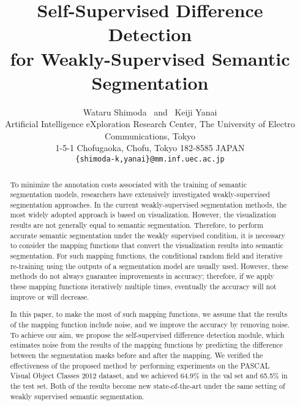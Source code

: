 \documentclass[10pt,twocolumn,letterpaper]{article}
\begin{document}
\title{Self-Supervised Difference Detection\\
for Weakly-Supervised Semantic Segmentation}

\author{Wataru Shimoda ~and~ Keiji Yanai \medskip \\
Artificial Intelligence eXploration Research Center,
The University of Electro Communications, Tokyo\\
1-5-1 Chofugaoka, Chofu, Tokyo 182-8585 JAPAN\\
{\tt\small \{shimoda-k,yanai\}@mm.inf.uec.ac.jp}
}

\maketitle




\begin{abstract}
To minimize the annotation costs associated with the training of semantic segmentation models,
researchers have extensively investigated weakly-supervised segmentation approaches.
In the current weakly-supervised segmentation methods, the most widely adopted approach is based on visualization.
However, the visualization results are not generally equal to semantic segmentation.
Therefore, to perform accurate semantic segmentation under the weakly supervised condition, it is necessary to consider the mapping functions that convert the visualization results into semantic segmentation.
For such mapping functions, the conditional random field and iterative re-training using the outputs of a segmentation model are usually used.
However, these methods do not always guarantee improvements in accuracy; therefore, if we apply these mapping functions iteratively multiple times, eventually the accuracy will not improve or will decrease.

In this paper, to make the most of such mapping functions, we assume that the results of the mapping function include noise, and we improve the accuracy by removing noise.
To achieve our aim, we propose the self-supervised difference detection module, which estimates noise from the results of the mapping functions by predicting the difference between the segmentation masks before and after the mapping.
We verified the effectiveness of the proposed method by performing experiments on the PASCAL Visual Object Classes 2012 dataset, and we achieved 64.9\% in the val set and 65.5\% in the test set.
Both of the results become new state-of-the-art under the same setting
of weakly supervised semantic segmentation.
\end{abstract}
\end{document}
